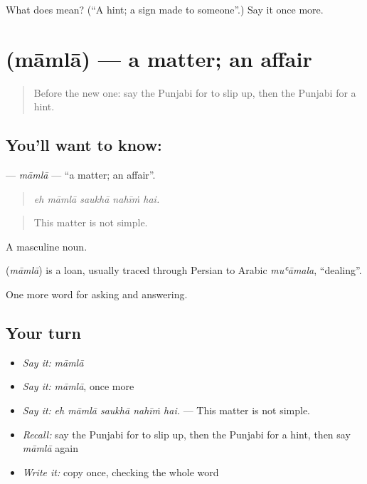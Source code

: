 \begin{tcolorbox}[breakable,colback=teal!4,colframe=teal!35!black,title={Before you move on}]
What does  mean? (\textquotedblleft{}A hint; a sign made to someone\textquotedblright{}.) Say it once more.
\end{tcolorbox}
\section[\texorpdfstring{\pa{ਮਾਮਲਾ} (māmlā)}{ਮਾਮਲਾ (māmlā)}]{ (māmlā) — a matter; an affair}

\label{lesson:PA-C343-mamla}



\begin{quote}
Before the new one: say the Punjabi for to slip up, then the Punjabi for a hint.
\end{quote}

\subsection*{You'll want to know: }
\textbf{} — \emph{māmlā} — \textquotedblleft{}a matter; an affair\textquotedblright{}.

\begin{quote}
    
\end{quote}

\begin{quote}
\emph{eh māmlā saukhā nahīṁ hai.}
\end{quote}

\begin{quote}
This matter is not simple.
\end{quote}

A masculine noun.

\begin{cousinweb}
\textbf{} (\emph{māmlā}) is a loan, usually traced through Persian to Arabic \emph{muʿāmala}, \textquotedblleft{}dealing\textquotedblright{}.
\end{cousinweb}

\begin{grammarlens}[title={What you've built}]
One more word for asking and answering.
\end{grammarlens}

\subsection*{Your turn}
\begin{itemize}
\raggedright
  \item \emph{Say it:} \emph{māmlā}
  \item \emph{Say it:} \emph{māmlā}, once more
  \item \emph{Say it:} \emph{eh māmlā saukhā nahīṁ hai.} — This matter is not simple.
  \item \emph{Recall:} say the Punjabi for to slip up, then the Punjabi for a hint, then say \emph{māmlā} again
  \item \emph{Write it:} copy \textbf{} once, checking the whole word
\end{itemize}

